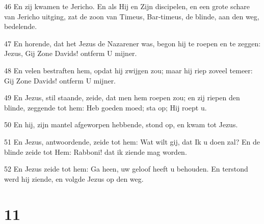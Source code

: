 \par 46 En zij kwamen te Jericho. En als Hij en Zijn discipelen, en een grote schare van Jericho uitging, zat de zoon van Timeus, Bar-timeus, de blinde, aan den weg, bedelende.
\par 47 En horende, dat het Jezus de Nazarener was, begon hij te roepen en te zeggen: Jezus, Gij Zone Davids! ontferm U mijner.
\par 48 En velen bestraften hem, opdat hij zwijgen zou; maar hij riep zoveel temeer: Gij Zone Davids! ontferm U mijner.
\par 49 En Jezus, stil staande, zeide, dat men hem roepen zou; en zij riepen den blinde, zeggende tot hem: Heb goeden moed; sta op; Hij roept u.
\par 50 En hij, zijn mantel afgeworpen hebbende, stond op, en kwam tot Jezus.
\par 51 En Jezus, antwoordende, zeide tot hem: Wat wilt gij, dat Ik u doen zal? En de blinde zeide tot Hem: Rabboni! dat ik ziende mag worden.
\par 52 En Jezus zeide tot hem: Ga heen, uw geloof heeft u behouden. En terstond werd hij ziende, en volgde Jezus op den weg.

\chapter{11}

